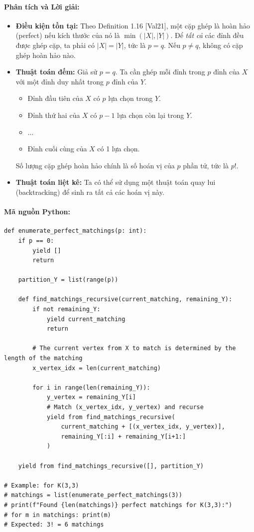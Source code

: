 \documentclass[a4paper,12pt]{article}
\begin{document}
\paragraph{Phân tích và Lời giải:}
\begin{itemize}
    \item \textbf{Điều kiện tồn tại:} Theo Definition 1.16 [Val21], một cặp ghép là hoàn hảo (perfect) nếu kích thước của nó là $\min(|X|, |Y|)$. Để \textit{tất cả} các đỉnh đều được ghép cặp, ta phải có $|X|=|Y|$, tức là $p=q$. Nếu $p \neq q$, không có cặp ghép hoàn hảo nào.
    \item \textbf{Thuật toán đếm:} Giả sử $p=q$. Ta cần ghép mỗi đỉnh trong $p$ đỉnh của $X$ với một đỉnh duy nhất trong $p$ đỉnh của $Y$.
        \begin{itemize}
            \item Đỉnh đầu tiên của $X$ có $p$ lựa chọn trong $Y$.
            \item Đỉnh thứ hai của $X$ có $p-1$ lựa chọn còn lại trong $Y$.
            \item ...
            \item Đỉnh cuối cùng của $X$ có 1 lựa chọn.
        \end{itemize}
    Số lượng cặp ghép hoàn hảo chính là số hoán vị của $p$ phần tử, tức là $p!$.
    \item \textbf{Thuật toán liệt kê:} Ta có thể sử dụng một thuật toán quay lui (backtracking) để sinh ra tất cả các hoán vị này.
\end{itemize}

\paragraph{Mã nguồn Python:}
\begin{lstlisting}[style=pythonstyle, caption={Liệt kê tất cả các cặp ghép hoàn hảo trong Kp,p.}]
def enumerate_perfect_matchings(p: int):
    if p == 0:
        yield []
        return
        
    partition_Y = list(range(p))
    
    def find_matchings_recursive(current_matching, remaining_Y):
        if not remaining_Y:
            yield current_matching
            return

        # The current vertex from X to match is determined by the length of the matching
        x_vertex_idx = len(current_matching)

        for i in range(len(remaining_Y)):
            y_vertex = remaining_Y[i]
            # Match (x_vertex_idx, y_vertex) and recurse
            yield from find_matchings_recursive(
                current_matching + [(x_vertex_idx, y_vertex)],
                remaining_Y[:i] + remaining_Y[i+1:]
            )

    yield from find_matchings_recursive([], partition_Y)

# Example: for K(3,3)
# matchings = list(enumerate_perfect_matchings(3))
# print(f"Found {len(matchings)} perfect matchings for K(3,3):")
# for m in matchings: print(m)
# Expected: 3! = 6 matchings
\end{lstlisting}
\end{document}

